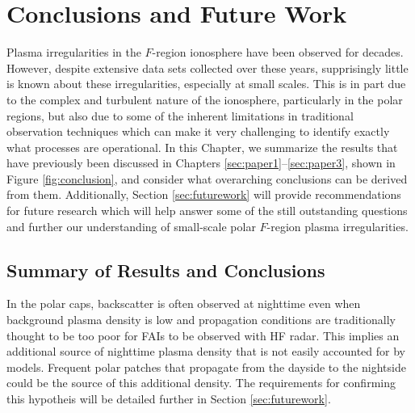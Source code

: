 
\chapter{Conclusions and Future Work}
\label{sec:conclusion}

Plasma irregularities in the \(F\)-region ionosphere have been observed for decades.  However, despite extensive data sets collected over these years, supprisingly little is known about these irregularities, especially at small scales.  This is in part due to the complex and turbulent nature of the ionosphere, particularly in the polar regions, but also due to some of the inherent limitations in traditional observation techniques which can make it very challenging to identify exactly what processes are operational.  In this Chapter, we summarize the results that have previously been discussed in Chapters \ref{sec:paper1}--\ref{sec:paper3}, shown in Figure \ref{fig:conclusion}, and consider what overarching conclusions can be derived from them.  Additionally, Section \ref{sec:futurework} will provide recommendations for future research which will help answer some of the still outstanding questions and further our understanding of small-scale polar \(F\)-region plasma irregularities.

\section{Summary of Results and Conclusions}
\label{sec:summary}

In the polar caps, backscatter is often observed at nighttime even when background plasma density is low and propagation conditions are traditionally thought to be too poor for FAIs to be observed with HF radar.  This implies an additional source of nighttime plasma density that is not easily accounted for by models.  Frequent polar patches that propagate from the dayside to the nightside could be the source of this additional density.  The requirements for confirming this hypotheis will be detailed further in Section \ref{sec:futurework}.

